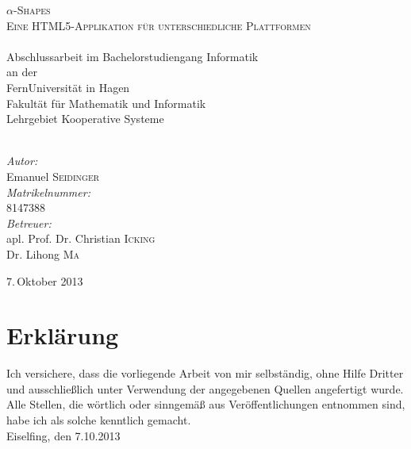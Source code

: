 \documentclass[12pt,a4paper,headsepline,bibliography=totoc,listof=totoc]{scrbook}
\begin{document}
\newtheorem{defi}{Definition}
\newenvironment{defin}{\begin{defi}\rm}{\end{defi}}
\newtheorem{eige}{Eigenschaft}
\newenvironment{eigen}{\begin{eige}\rm}{\end{eige}}
\newtheorem{lemm}{Lemma}
\newenvironment{lemma}{\begin{lemm}\rm}{\end{lemm}}

\begin{titlepage}
\begin{center}
\vspace*{1cm}
\textsc{\Huge $\alpha$-Shapes}\\[1cm]
\textsc{\LARGE Eine HTML5-Applikation für unterschiedliche Plattformen\\~}\\[1.5cm]
{\Large Abschlussarbeit im Bachelorstudiengang Informatik}\\[1cm]
{\large an der}\\
{\Large FernUniversität in Hagen\\Fakultät für Mathematik und Informatik\\Lehrgebiet Kooperative Systeme\\~}\\[2cm]
\begin{flushleft} \large
\emph{Autor:}\\
Emanuel \textsc{Seidinger}\\
\emph{Matrikelnummer:}\\
8147388\\[1cm]
\emph{Betreuer:}\\
apl. Prof. Dr. Christian \textsc{Icking}\\
Dr. Lihong \textsc{Ma}
\end{flushleft}
\vspace*{2cm}
{\large 7.\,Oktober 2013}
\end{center}
\end{titlepage}

\tableofcontents

\chapter*{Erklärung}
Ich versichere, dass die vorliegende Arbeit von mir selbständig, ohne Hilfe Dritter und ausschließlich unter Verwendung der angegebenen Quellen angefertigt wurde. Alle Stellen, die wörtlich oder sinngemäß aus Veröffentlichungen entnommen sind, habe ich als solche kenntlich gemacht.\\[1cm]
Eiselfing, den 7.10.2013








\appendix


\printbibliography
\listoffigures
\end{document}
